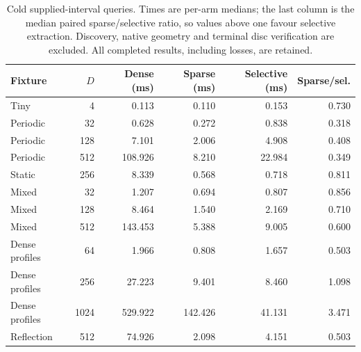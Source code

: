 \begin{table}[htbp]
\centering\small
\begin{tabular}{lrrrrr}
\toprule
Fixture & $D$ & Dense (ms) & Sparse (ms) & Selective (ms) & Sparse/sel.\\
\midrule
Tiny & 4 & 0.113 & 0.110 & 0.153 & 0.730\\
Periodic & 32 & 0.628 & 0.272 & 0.838 & 0.318\\
Periodic & 128 & 7.101 & 2.006 & 4.908 & 0.408\\
Periodic & 512 & 108.926 & 8.210 & 22.984 & 0.349\\
Static & 256 & 8.339 & 0.568 & 0.718 & 0.811\\
Mixed & 32 & 1.207 & 0.694 & 0.807 & 0.856\\
Mixed & 128 & 8.464 & 1.540 & 2.169 & 0.710\\
Mixed & 512 & 143.453 & 5.388 & 9.005 & 0.600\\
Dense profiles & 64 & 1.966 & 0.808 & 1.657 & 0.503\\
Dense profiles & 256 & 27.223 & 9.401 & 8.460 & 1.098\\
Dense profiles & 1024 & 529.922 & 142.426 & 41.131 & 3.471\\
Reflection & 512 & 74.926 & 2.098 & 4.151 & 0.503\\
\bottomrule
\end{tabular}
\caption{Cold supplied-interval queries. Times are per-arm medians; the last column is the median paired sparse/selective ratio, so values above one favour selective extraction. Discovery, native geometry and terminal disc verification are excluded. All completed results, including losses, are retained.}
\label{tab:timings}
\end{table}
